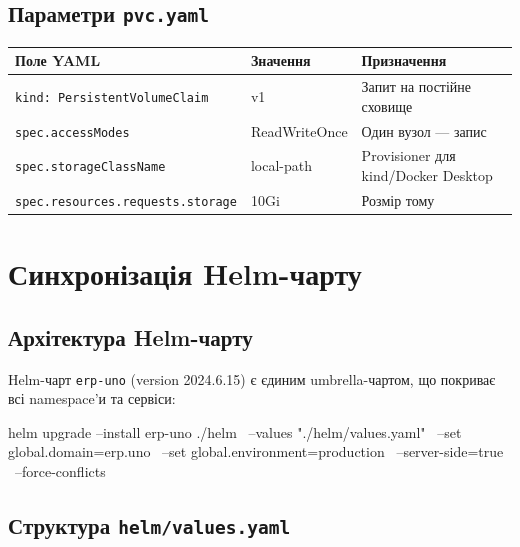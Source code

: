 \documentclass[12pt,a4paper]{article}
\let\originalfootnotesize\footnotesize
\let\oldverbatim\verbatim
\let\oldendverbatim\endverbatim
\renewenvironment{verbatim}{\originalfootnotesize\oldverbatim}{\oldendverbatim}
\begin{document}
\subsection{Параметри \texttt{pvc.yaml}}

\begin{longtable}{L{5.0cm} L{2.5cm} L{6.6cm}}
\toprule
{}
\color{primary}\textbf{Поле YAML} & \color{primary}\textbf{Значення} & \color{primary}\textbf{Призначення} \\
\midrule\endhead\bottomrule\endfoot
\texttt{kind: PersistentVolumeClaim} & v1 & Запит на постійне сховище \\[2pt]
\texttt{spec.accessModes} & ReadWriteOnce & Один вузол --- запис \\[2pt]
\texttt{spec.storageClassName} & local-path  & Provisioner для kind/Docker Desktop \\[2pt]
\texttt{spec.resources.requests.storage} & 10Gi & Розмір тому \\[2pt]
\end{longtable}

\newpage
\section{Синхронізація Helm-чарту}

\subsection{Архітектура Helm-чарту}

Helm-чарт \texttt{erp-uno} (version 2024.6.15) є єдиним umbrella-чартом,
що покриває всі namespace'и та сервіси:

\begin{verbatim}
helm upgrade --install erp-uno ./helm \
  --values "./helm/values.yaml" \
  --set global.domain=erp.uno \
  --set global.environment=production \
  --server-side=true \
  --force-conflicts
\end{verbatim}

\subsection{Структура \texttt{helm/values.yaml}}
\end{document}

